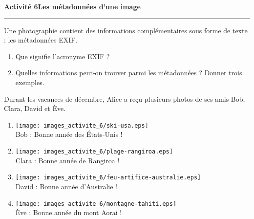 \documentclass[a4paper]{article}
\begin{document}
%
%

\noindent\textbf{Activité 6}\hfill{}\textbf{Les métadonnées d'une image}
\smallskip
\hrule
\medskip

Une photographie contient des informations complémentaires sous forme de texte : les métadonnées EXIF.

\begin{enumerate}
  \item Que signifie l'acronyme EXIF ?
  \item Quelles informations peut-on trouver parmi les métadonnées ? Donner trois exemples.
\end{enumerate}

Durant les vacances de décembre, Alice a reçu plusieurs photos de ses amis Bob, Clara, David et Ève.

\begin{center}
  \begin{multicols}{4}
    \begin{enumerate}
      \item[] \texttt{[image: images\_activite\_6/ski-usa.eps]}\\
	Bob : \og{}Bonne année des États-Unis !\fg{}
      \item[] \texttt{[image: images\_activite\_6/plage-rangiroa.eps]}\\
	Clara : \og{}Bonne année de Rangiroa !\fg{}
      \item[] \texttt{[image: images\_activite\_6/feu-artifice-australie.eps]}\\
	David : \og{}Bonne année d'Australie !\fg{}
      \item[] \texttt{[image: images\_activite\_6/montagne-tahiti.eps]}\\
	Ève : \og{}Bonne année du mont Aorai !\fg{}
    \end{enumerate}
  \end{multicols}
\end{center}
\end{document}
